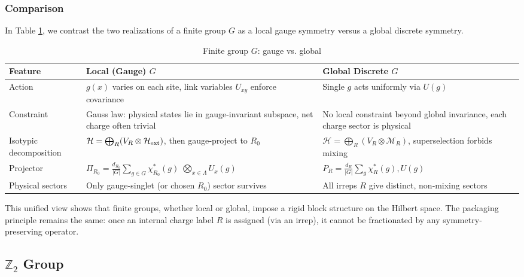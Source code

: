 \documentclass[12pt,a4paper]{article}
\begin{document}
\subsubsection{Comparison}


In Table \ref{TAB:FiniteGaugeVsGlobal}, we contrast the two realizations of a finite group $G$ as a local gauge symmetry versus a global discrete symmetry.

\begin{table}[h]
	\centering
	\caption{Finite group $G$: gauge vs. global}
	\label{TAB:FiniteGaugeVsGlobal}
	\begin{tabular}{p{3cm}|p{6cm}|p{5.5cm}}
		\toprule
		Feature & Local (Gauge) $G$ & Global Discrete $G$ \\
		\midrule
		Action & $g(x)$ varies on each site, link variables $U_{xy}$ enforce covariance & Single $g$ acts uniformly via $U(g)$ \\
		\hline
		Constraint & Gauss law: physical states lie in gauge-invariant subspace, net charge often trivial & No local constraint beyond global invariance, each charge sector is physical \\
		\hline
		Isotypic decomposition & $\mathcal H = \bigoplus_R (V_R \otimes \mathcal H_{\rm ext})$, then gauge‐project to $R_0$ & $\mathcal H = \bigoplus_R (V_R \otimes \mathcal M_R)$, superselection forbids mixing \\
		\hline
		Projector & $\Pi_{R_0} = \frac{d_{R_0}}{|G|}\sum_{g\in G}\chi_{R_0}^*(g)\;\bigotimes_{x\in\Lambda}U_x(g)$ & $P_R=\frac{d_R}{|G|}\sum_g\chi_R^*(g),U(g)$ \\
		\hline
		Physical sectors & Only gauge‐singlet (or chosen $R_0$) sector survives & All irreps $R$ give distinct, non‐mixing sectors \\
		\bottomrule
	\end{tabular}
\end{table}



This unified view shows that finite groups, whether local or global, impose a rigid block structure on the Hilbert space.
The packaging principle remains the same:
once an internal charge label $R$ is assigned (via an irrep), it cannot be fractionated by any symmetry‐preserving operator.



\subsection{$\mathbb{Z}_2$ Group}
\label{sec:Z2examples}
\end{document}

